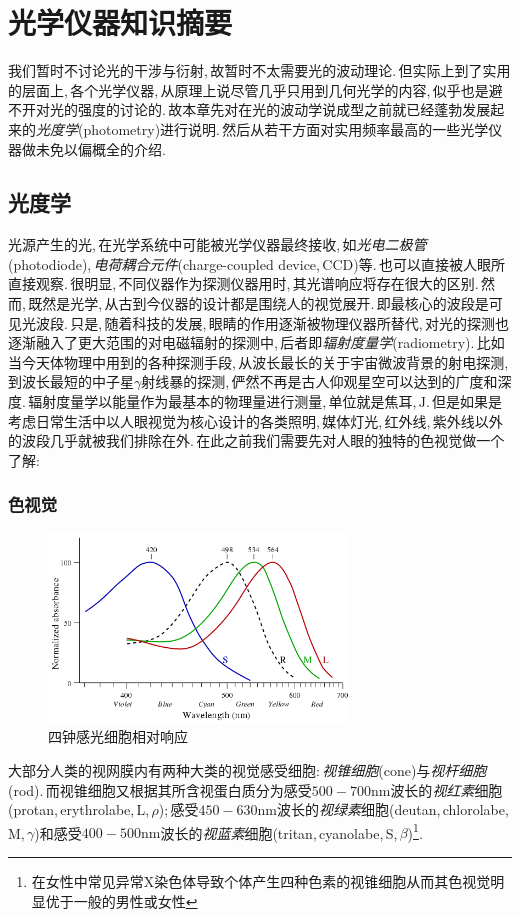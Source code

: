 \chapter{光学仪器知识摘要}


我们暂时不讨论光的干涉与衍射,\,故暂时不太需要光的波动理论.\,但实际上到了实用的层面上,\,各个光学仪器,\,从原理上说尽管几乎只用到几何光学的内容,\,似乎也是避不开对光的强度的讨论的.\,故本章先对在光的波动学说成型之前就已经蓬勃发展起来的\emph{光度学}(photometry)进行说明.\,然后从若干方面对实用频率最高的一些光学仪器做未免以偏概全的介绍.



\section{光度学}


光源产生的光,\,在光学系统中可能被光学仪器最终接收,\,如\emph{光电二极管}(photodiode),\,\emph{电荷耦合元件}(charge-coupled device,\,CCD)等.\,也可以直接被人眼所直接观察.\,很明显,\,不同仪器作为探测仪器用时,\,其光谱响应将存在很大的区别.\,然而,\,既然是光学,\,从古到今仪器的设计都是围绕人的视觉展开.\,即最核心的波段是可见光波段.\,只是,\,随着科技的发展,\,眼睛的作用逐渐被物理仪器所替代,\,对光的探测也逐渐融入了更大范围的对电磁辐射的探测中,\,后者即\emph{辐射度量学}(radiometry).\,比如当今天体物理中用到的各种探测手段,\,从波长最长的关于宇宙微波背景的射电探测,\,到波长最短的中子星$\gamma$射线暴的探测,\,俨然不再是古人仰观星空可以达到的广度和深度.\,辐射度量学以能量作为最基本的物理量进行测量,\,单位就是焦耳,\,$\mathrm{J}$.\,但是如果是考虑日常生活中以人眼视觉为核心设计的各类照明,\,媒体灯光,\,红外线,\,紫外线以外的波段几乎就被我们排除在外.\,在此之前我们需要先对人眼的独特的色视觉做一个了解:

\subsection{色视觉}
\begin{figure}
\centering
\includegraphics[width=8cm]{image/5-8-1.png}
\caption{四钟感光细胞相对响应}
\end{figure}
大部分人类的视网膜内有两种大类的视觉感受细胞:\,\emph{视锥细胞}(cone)与\emph{视杆细胞}(rod).\,而视锥细胞又根据其所含视蛋白质分为感受$500-700\mathrm{nm}$波长的\emph{视红素}细胞(protan,\,erythrolabe,\,L,\,$\rho$);\,感受$450-630\mathrm{nm}$波长的\emph{视绿素}细胞(deutan,\,chlorolabe,\,M,\,$\gamma$)和感受$400-500\mathrm{nm}$波长的\emph{视蓝素}细胞(tritan,\,cyanolabe,\,S,\,$\beta$)\footnote{在女性中常见异常X染色体导致个体产生四种色素的视锥细胞从而其色视觉明显优于一般的男性或女性}.\,




